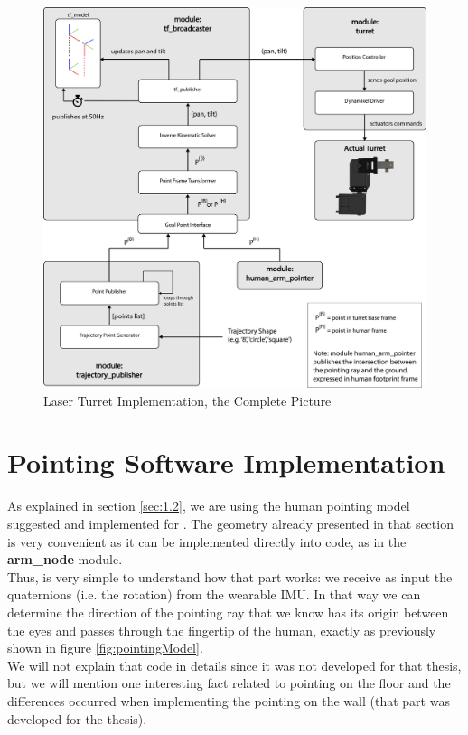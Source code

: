 \begin{figure}
	\centering
	\includegraphics[width=\textwidth]{img/turretPipeline.png}%
	\caption{Laser Turret Implementation, the Complete Picture}
	\label{fig:turretPipeline}
\end{figure}


\section{Pointing Software Implementation}
As explained in section \ref{sec:1.2}, we are using the human pointing model suggested and implemented for \cite{gromov2018robot}. The geometry already presented in that section is very convenient as it can be implemented directly into code, as in the \textbf{arm\_node} module.\\
Thus, is very simple to understand how that part works: we receive as input the quaternions (i.e. the rotation) from the wearable IMU. In that way we can determine the direction of the pointing ray that we know has its origin between the eyes and passes through the fingertip of the human, exactly as previously shown in figure \ref{fig:pointingModel}.\\
We will not explain that code in details since it was not developed for that thesis, but we will mention one interesting fact related to pointing on the floor and the differences occurred when implementing the pointing on the wall (that part was developed for the thesis).
